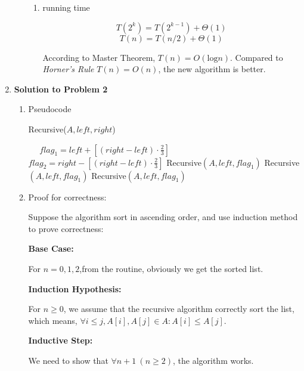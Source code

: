 \documentclass[11pt]{article}
\begin{document}
\begin{enumerate}
\begin{enumerate}
\begin{enumerate}
    \item running time
    
    $$T(2^k)=T(2^{k-1})+\Theta(1)$$
    $$T(n)=T(n/2)+\Theta(1)$$
    
    According to Master Theorem, $T(n)=O(\text{log} n)$. Compared to \textit{Horner's Rule} $T(n)=O(n)$, the new algorithm is better.
    
    \end{enumerate}
	\end{enumerate}
		
	\item \textbf{Solution to Problem 2}
	\begin{enumerate}
	\item Pseudocode
	
	\begin{algorithm}[H]
    \caption{Recursive($A,left,right$)}	
    \begin{algorithmic}
    \State \Return
         \State \Return
         \Else \ 
        \EndIf
    \Else
    \
    \State $flag_1=left+[(right-left)\cdot\frac{2}{3}]$
    \State $flag_2=right-[(right-left)\cdot \frac{2}{3}]$
    \State Recursive$(A,left,flag_1)$
    \State Recursive$(A,left,flag_1)$
    \State Recursive$(A,left,flag_1)$
	\EndIf
    
    \end{algorithmic}
    \end{algorithm}

	
	
	

	    
	    
	\item Proof for correctness:   
	
	Suppose the algorithm sort in ascending order, and use induction method to prove correctness:
	
	\textbf{Base Case:}
	
	For $n=0,1,2$,from the routine, obviously we get the sorted list.
	
	\textbf{Induction Hypothesis:}
	
	For $n \geq 0$, we assume that the recursive algorithm correctly sort the list, which means, ${\forall} i \leq j, A[i],A[j] \in  A: A[i] \leq A[j]$.
	
	\textbf{Inductive Step:}
	\
	
	We need to show that ${\forall} n+1 \ (n\geq 2)$, the algorithm works. 
	

\end{enumerate}
\end{enumerate}
\end{document}
